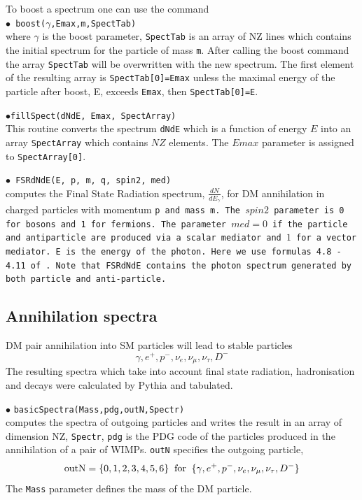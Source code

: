 \documentclass[12pt,a4paper]{article}
\begin{document}
To boost a spectrum one can use the command \\
$\bullet$\verb| boost(|$\gamma$\verb|,Emax,m,SpectTab)|\\
where $\gamma$ is the boost parameter, {\tt SpectTab} is an array of NZ lines which contains the initial spectrum  for the particle of mass \verb|m|. After calling the boost command  the array  {\tt SpectTab} will be overwritten with the new spectrum. The first element of the resulting array is {\tt SpectTab[0]=Emax} unless the maximal energy of the particle after boost, E,  exceeds {\tt Emax}, then {\tt SpectTab[0]=E}.

{
\color{blue}

$\bullet$\verb|fillSpect(dNdE, Emax, SpectArray)|\\
This routine converts the spectrum \verb|dNdE| which is  a function of energy $E$ into an array {\tt SpectArray} which contains $NZ$ elements.
The $Emax$ parameter is assigned to {\tt SpectArray[0]}.


$\bullet$\verb| FSRdNdE(E, p, m, q, spin2, med)|\\
computes the  Final State Radiation spectrum, $ \frac{dN}{dE_{\gamma}}$,  for DM  annihilation in charged particles with  momentum \tt{p} and mass \tt{m}.
The $spin2$ parameter is 0 for bosons and 1 for fermions. The parameter $med=0$ if the particle and antiparticle are produced via a
scalar mediator and $1$ for a  vector mediator. \tt{E} is the energy of the  photon.    Here we use formulas 4.8 - 4.11  
of \cite{Coogan_2020}. Note that FSRdNdE contains the photon spectrum  generated by  both particle and anti-particle.   
}

\subsection{Annihilation spectra}
\label{A_Spectra}

DM pair  annihilation into  SM particles will lead to stable particles
\begin{equation}
\label{outN} 
  \gamma,   e^+,  p^-, \nu_e, \nu_{\mu},\nu_\tau,D^-
\end{equation}
The resulting spectra which take into account final state radiation, hadronisation  and decays were  calculated by Pythia and tabulated. 

\noindent
$\bullet$ \verb|basicSpectra(Mass,pdg,outN,Spectr)|\\
computes the spectra of outgoing particles and writes the result in an array of dimension NZ, \verb|Spectr|,
\verb|pdg| is the PDG code of the particles produced in the annihilation of a pair of 
WIMPs.  \verb|outN|  specifies the outgoing particle,
$$ {\rm outN} = \{0,1,2,3,4,5,6\} \;\; {\rm for}\;\; \{\gamma,   e^+,  p^-, \nu_e,
\nu_{\mu},\nu_{\tau},D^-\} $$
The {\tt Mass} parameter defines the mass of the DM particle.
\end{document}
